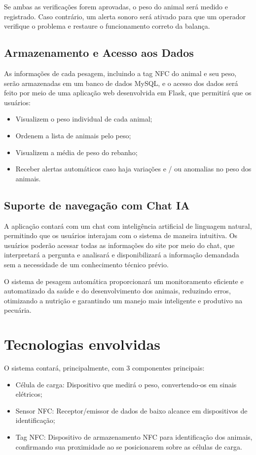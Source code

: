 \documentclass[11pt]{article}
\begin{document}
Se ambas as verificações forem aprovadas, o peso do animal será medido e registrado. Caso contrário, um alerta sonoro será ativado para que um operador verifique o problema e restaure o funcionamento correto da balança.

\subsection{Armazenamento e Acesso aos Dados}
As informações de cada pesagem, incluindo a tag NFC do animal e seu peso, serão armazenadas em um banco de dados MySQL, e o acesso dos dados será feito por meio de uma aplicação web desenvolvida em Flask, que permitirá que os usuários:

\begin{itemize}
    \item Visualizem o peso individual de cada animal;
    \item Ordenem a lista de animais pelo peso;
    \item Visualizem a média de peso do rebanho;
    \item Receber alertas automáticos caso haja variações e / ou anomalias no peso dos animais.
\end{itemize}

\subsection{Suporte de navegação com Chat IA}
A aplicação contará com um chat com inteligência artificial de linguagem natural, permitindo que os usuários interajam com o sistema de maneira intuitiva. Os usuários poderão acessar todas as informações do site por meio do chat, que interpretará a pergunta e analisará e disponibilizará a informação demandada sem a necessidade de um conhecimento técnico prévio.

O sistema de pesagem automática proporcionará um monitoramento eficiente e automatizado da saúde e do desenvolvimento dos animais, reduzindo erros, otimizando a nutrição e garantindo um manejo mais inteligente e produtivo na pecuária.

\section{Tecnologias envolvidas}
O sistema contará, principalmente, com 3 componentes principais:
\begin{itemize}
    \item Célula de carga: Dispositivo que medirá o peso, convertendo-os em sinais elétricos;
    \item Sensor NFC: Receptor/emissor de dados de baixo alcance em dispositivos de identificação;
    \item Tag NFC: Dispositivo de armazenamento NFC para identificação dos animais, confirmando sua proximidade ao se posicionarem sobre as células de carga.
\end{itemize}
\end{document}
